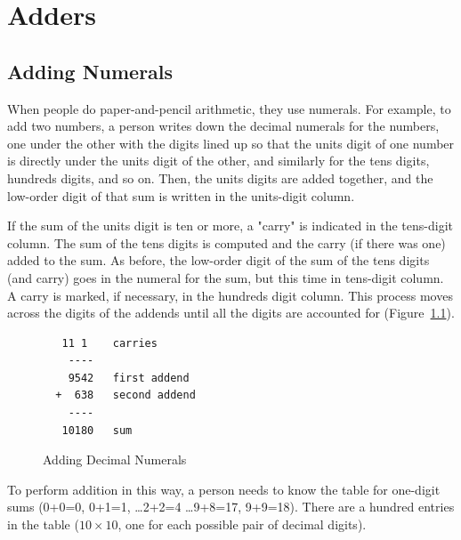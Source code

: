 \chapter{Adders}
\label{ch:adders}


\section{Adding Numerals}
\label{sec:addition-by-numeral}

When people do paper-and-pencil arithmetic,
they use numerals.
For example, to add two numbers, a person
writes down the decimal numerals for the numbers,
one under the other with the digits lined up so that
the units digit of one number is directly under
the units digit of the other, and similarly for
the tens digits, hundreds digits, and so on.
Then, the units digits are added together,
and the low-order digit of that sum is written
in the units-digit column.

If the sum of the units digit is ten or more,
a "carry" is indicated in the tens-digit column.
The sum of the tens digits is computed and the
carry (if there was one) added to the sum.
As before, the low-order digit of the sum of the
tens digits (and carry) goes in the numeral for the sum,
but this time in tens-digit column.
A carry is marked, if necessary,
in the hundreds digit column.
This process moves across the digits of the addends until all the digits
are accounted for (Figure~\ref{fig:adding-decimal-numerals}).

\begin{figure}
\begin{center}
\begin{minipage}[b]{0.4\textwidth}
\begin{verbatim}
   11 1    carries
    ----
    9542   first addend
  +  638   second addend
    ----
   10180   sum
\end{verbatim}
\end{minipage}
\end{center}
\caption{Adding Decimal Numerals}
\label{fig:adding-decimal-numerals}
\end{figure}

To perform addition in this way, a person needs to know
the table for one-digit sums (0+0=0, 0+1=1, \dots 2+2=4 \dots 9+8=17, 9+9=18).
There are a hundred entries in the table ($10 \times 10$, one for each
possible pair of decimal digits).

